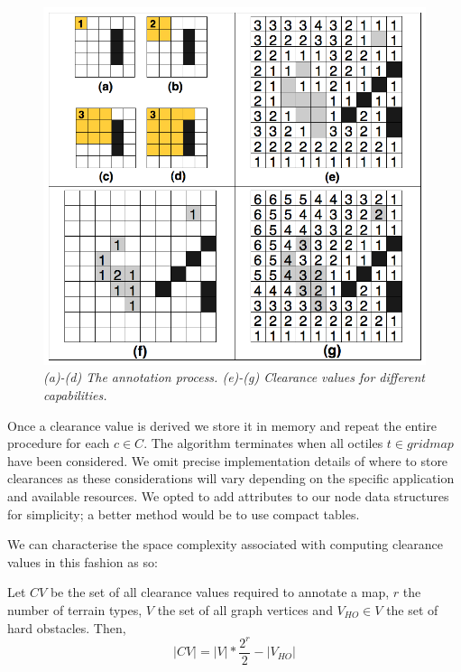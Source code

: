 \begin{figure}[htbp]
       \caption{\emph{(a)-(d) The annotation process. (e)-(g) Clearance values for different capabilities.}}
       \begin{center}
                       \includegraphics[scale=0.25]{diagrams/annotations.png}
       \end{center}
       \label{aha-fig:annotations}
\end{figure}

Once a clearance value is derived we store it in memory and repeat the entire procedure for each $c \in C$. The algorithm terminates when all octiles $t \in gridmap$ have been considered. 
We omit precise implementation details of where to store clearances as these considerations will vary depending on the specific application and available resources. We opted to add attributes to our node data structures for simplicity; a better method would be to use compact tables.
\par \indent
We can characterise the space complexity associated with computing clearance values in this fashion as so:
\begin{lemma}
\label{aha-lemma:numannotations}
Let $CV$ be the set of all clearance values required to annotate a map, $r$ the number of terrain types, $V$ the set of all graph vertices and $V_{HO} \in V$ the set of hard obstacles. Then,  $$|CV| = |V|*\frac{2^r}{2} - |V_{HO}|$$
\end{lemma}

